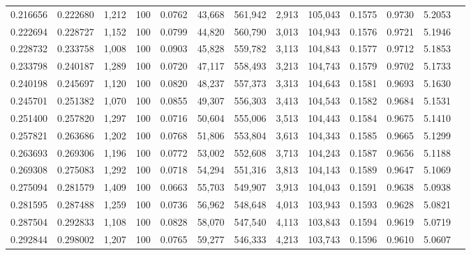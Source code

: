 \begin{tabular}{rrrrrrrrrrrrr}
0.216656 & 0.222680 & 1,212 & 100 &                                     0.0762 &  43,668 & 561,942 &   2,913 & 105,043 & 0.1575 & 0.9730 & 5.2053 \\
0.222694 & 0.228727 & 1,152 & 100 &                                     0.0799 &  44,820 & 560,790 &   3,013 & 104,943 & 0.1576 & 0.9721 & 5.1946 \\
0.228732 & 0.233758 & 1,008 & 100 &                                     0.0903 &  45,828 & 559,782 &   3,113 & 104,843 & 0.1577 & 0.9712 & 5.1853 \\
0.233798 & 0.240187 & 1,289 & 100 &                                     0.0720 &  47,117 & 558,493 &   3,213 & 104,743 & 0.1579 & 0.9702 & 5.1733 \\
0.240198 & 0.245697 & 1,120 & 100 &                                     0.0820 &  48,237 & 557,373 &   3,313 & 104,643 & 0.1581 & 0.9693 & 5.1630 \\
0.245701 & 0.251382 & 1,070 & 100 &                                     0.0855 &  49,307 & 556,303 &   3,413 & 104,543 & 0.1582 & 0.9684 & 5.1531 \\
0.251400 & 0.257820 & 1,297 & 100 &                                     0.0716 &  50,604 & 555,006 &   3,513 & 104,443 & 0.1584 & 0.9675 & 5.1410 \\
0.257821 & 0.263686 & 1,202 & 100 &                                     0.0768 &  51,806 & 553,804 &   3,613 & 104,343 & 0.1585 & 0.9665 & 5.1299 \\
0.263693 & 0.269306 & 1,196 & 100 &                                     0.0772 &  53,002 & 552,608 &   3,713 & 104,243 & 0.1587 & 0.9656 & 5.1188 \\
0.269308 & 0.275083 & 1,292 & 100 &                                     0.0718 &  54,294 & 551,316 &   3,813 & 104,143 & 0.1589 & 0.9647 & 5.1069 \\
0.275094 & 0.281579 & 1,409 & 100 &                                     0.0663 &  55,703 & 549,907 &   3,913 & 104,043 & 0.1591 & 0.9638 & 5.0938 \\
0.281595 & 0.287488 & 1,259 & 100 &                                     0.0736 &  56,962 & 548,648 &   4,013 & 103,943 & 0.1593 & 0.9628 & 5.0821 \\
0.287504 & 0.292833 & 1,108 & 100 &                                     0.0828 &  58,070 & 547,540 &   4,113 & 103,843 & 0.1594 & 0.9619 & 5.0719 \\
0.292844 & 0.298002 & 1,207 & 100 &                                     0.0765 &  59,277 & 546,333 &   4,213 & 103,743 & 0.1596 & 0.9610 & 5.0607 \\

\end{tabular}

